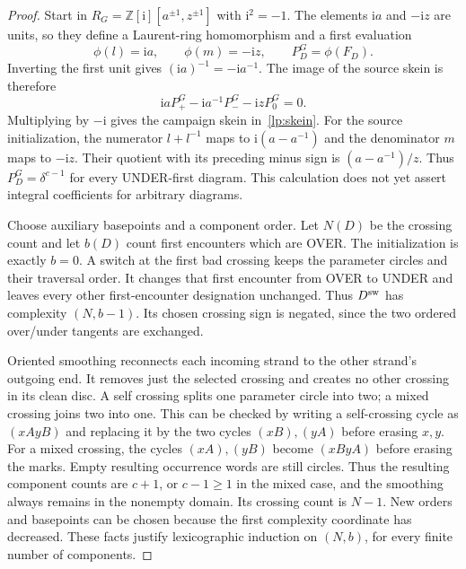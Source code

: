 \begin{proof}\leanok{}
Start in $R_G=\mathbb Z[\mathrm i][a^{\pm1},z^{\pm1}]$ with
$\mathrm i^2=-1$. The elements $\mathrm ia$ and $-\mathrm iz$ are units,
so they define a Laurent-ring homomorphism and a first evaluation
\begin{equation}\label{lp:gaussian}
 \phi(l)=\mathrm ia,\qquad \phi(m)=-\mathrm iz,
 \qquad P_D^G=\phi(F_D).
\end{equation}
Inverting the first unit gives $(\mathrm ia)^{-1}=-\mathrm ia^{-1}$.
The image of the source skein is therefore
\begin{equation}\label{lp:gaussian-skein}
 \mathrm iaP_+^G-\mathrm ia^{-1}P_-^G-\mathrm izP_0^G=0.
\end{equation}
Multiplying by $-\mathrm i$ gives the campaign skein in~\eqref{lp:skein}.
For the source initialization, the numerator $l+l^{-1}$ maps to
$\mathrm i(a-a^{-1})$ and the denominator $m$ maps to $-\mathrm iz$.
Their quotient with its preceding minus sign is $(a-a^{-1})/z$.
Thus $P_D^G=\delta^{c-1}$ for every UNDER-first diagram. This calculation
does not yet assert integral coefficients for arbitrary diagrams.

Choose auxiliary basepoints and a component order. Let $N(D)$ be the
crossing count and let $b(D)$ count first encounters which are OVER.
The initialization is exactly $b=0$. A switch at the first bad crossing
keeps the parameter circles and their traversal order. It changes that
first encounter from OVER to UNDER and leaves every other first-encounter
designation unchanged. Thus $D^{\rm sw}$ has complexity $(N,b-1)$.
Its chosen crossing sign is negated, since the two ordered over/under
tangents are exchanged.

Oriented smoothing reconnects each incoming strand to the other strand's
outgoing end. It removes just the selected crossing and creates no other
crossing in its clean disc. A self crossing splits one parameter circle
into two; a mixed crossing joins two into one. This can be checked by
writing a self-crossing cycle as $(x A y B)$ and replacing it by the
two cycles $(x B),(y A)$ before erasing $x,y$. For a mixed crossing,
the cycles $(x A),(y B)$ become $(x B y A)$ before erasing the marks.
Empty resulting occurrence words are still circles. Thus the resulting
component counts are $c+1$, or $c-1\geq1$ in the mixed case, and the
smoothing always remains in the nonempty domain. Its crossing count is
$N-1$. New orders and basepoints can be chosen because the first
complexity coordinate has decreased. These facts justify lexicographic
induction on $(N,b)$, for every finite number of components.


\end{proof}
